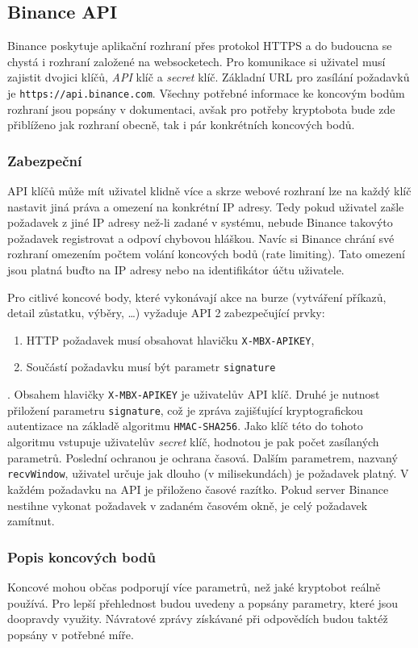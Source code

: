 \subsection{Binance API}
Binance poskytuje aplikační rozhraní přes protokol HTTPS a do budoucna se chystá i rozhraní založené na websocketech. Pro komunikace si uživatel musí zajistit dvojici klíčů, \emph{API} klíč 
a \emph{secret} klíč.
Základní URL pro zasílání požadavků je \verb|https://api.binance.com|.
Všechny potřebné informace ke koncovým bodům rozhraní jsou popsány v dokumentaci, avšak pro potřeby kryptobota bude zde přiblíženo jak rozhraní obecně, tak i pár konkrétních koncových bodů.

\subsubsection{Zabezpeční}
API klíčů může mít uživatel klidně více a skrze webové rozhraní lze na každý klíč nastavit jiná práva a omezení na konkrétní IP adresy. Tedy pokud uživatel zašle požadavek z jiné IP adresy než-li
zadané v systému, nebude Binance takovýto požadavek registrovat a odpoví chybovou hláškou. Navíc si Binance chrání své rozhraní omezením počtem volání koncových bodů (rate limiting). Tato omezení
jsou platná buďto na IP adresy nebo na identifikátor účtu uživatele.

Pro citlivé koncové body, které vykonávají akce na burze (vytváření příkazů, detail zůstatku, výběry, \ldots) vyžaduje API 2 zabezpečující prvky:
\begin{enumerate}
    \item HTTP požadavek musí obsahovat hlavičku \verb|X-MBX-APIKEY|,
    \item Součástí požadavku musí být parametr \verb|signature|
\end{enumerate} .
Obsahem hlavičky \verb|X-MBX-APIKEY| je uživatelův API klíč. Druhé je nutnost přiložení parametru \verb|signature|, což je zpráva zajišťující kryptografickou autentizace na základě 
algoritmu \verb|HMAC-SHA256|. Jako klíč této do tohoto algoritmu vstupuje uživatelův \emph{secret} klíč, hodnotou je pak počet zasílaných parametrů.
Poslední ochranou je ochrana časová. Dalším parametrem, nazvaný \verb|recvWindow|, uživatel určuje jak dlouho (v milisekundách) je požadavek platný. V každém požadavku na API je přiloženo
časové razítko. Pokud server Binance nestihne vykonat požadavek v zadaném časovém okně, je celý požadavek zamítnut.

\subsubsection{Popis koncových bodů}
Koncové mohou občas podporují více parametrů, než jaké kryptobot reálně používá. Pro lepší přehlednost budou uvedeny a popsány parametry, které jsou doopravdy využity. Návratové zprávy získávané
při odpovědích budou taktéž popsány v potřebné míře.

